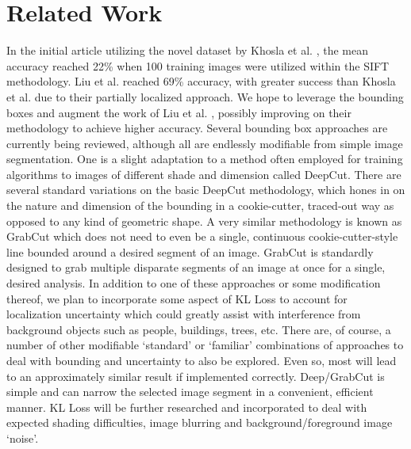 \documentclass{article}
\begin{document}
\section{Related Work}

In the initial article utilizing the novel dataset by Khosla et al. \cite{khosla2011novel}, the mean accuracy reached 22\% when 100 training images were utilized within the SIFT methodology. Liu et al. \cite{liu2012dog} reached 69\% accuracy, with greater success than Khosla et al. \cite{khosla2011novel} due to their partially localized approach.  We hope to leverage the bounding boxes and augment the work of Liu et al. \cite{liu2012dog}, possibly improving on their methodology to achieve higher accuracy. Several bounding box approaches are currently being reviewed, although all are endlessly modifiable from simple image segmentation. One is a slight adaptation to a method often employed for training algorithms to images of different shade and dimension called DeepCut.  \cite{rajchl2016deepcut} There are several standard variations on the basic DeepCut methodology, which hones in on the nature and dimension of the bounding in a cookie-cutter, traced-out way as opposed to any kind of geometric shape. A very similar methodology is known as GrabCut which does not need to even be a single, continuous cookie-cutter-style line bounded around a desired segment of an image. GrabCut is standardly designed to grab multiple disparate segments of an image at once for a single, desired analysis. In addition to one of these approaches or some modification thereof, we plan to incorporate some aspect of KL Loss to account for localization uncertainty which could greatly assist with interference from background objects such as people, buildings, trees, etc. \cite{he2019bounding} There are, of course, a number of other modifiable ‘standard’ or ‘familiar’ combinations of approaches to deal with bounding and uncertainty to also be explored. Even so, most will lead to an approximately similar result if implemented correctly. Deep/GrabCut is simple and can narrow the selected image segment in a convenient, efficient manner. KL Loss will be further researched and incorporated to deal with expected shading difficulties, image blurring and background/foreground image ‘noise’.



\end{document}

